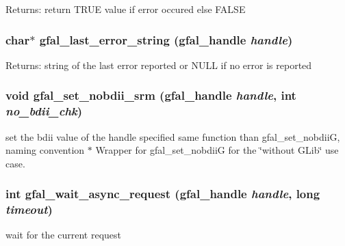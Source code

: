 \begin{Desc}
\item[Returns:]return TRUE value if error occured else FALSE \end{Desc}
\subsubsection{\setlength{\rightskip}{0pt plus 5cm}char$\ast$ gfal\_\-last\_\-error\_\-string (gfal\_\-handle {\em handle})}\label{gfal__common__interface_8c_bdebd69c0c6a74b1b5adf88b5e836d8a}


\begin{Desc}
\item[Returns:]string of the last error reported or NULL if no error is reported \end{Desc}
\subsubsection{\setlength{\rightskip}{0pt plus 5cm}void gfal\_\-set\_\-nobdii\_\-srm (gfal\_\-handle {\em handle}, int {\em no\_\-bdii\_\-chk})}\label{gfal__common__interface_8c_95450f539ccc18d88b0d7dede8519bef}


set the bdii value of the handle specified same function than gfal\_\-set\_\-nobdii\-G, naming convention $\ast$ Wrapper for gfal\_\-set\_\-nobdii\-G for the \char`\"{}without GLib\char`\"{} use case. 
\subsubsection{\setlength{\rightskip}{0pt plus 5cm}int gfal\_\-wait\_\-async\_\-request (gfal\_\-handle {\em handle}, long {\em timeout})}\label{gfal__common__interface_8c_08c8573e050334d5342a31a48b7db4cb}


wait for the current request 

